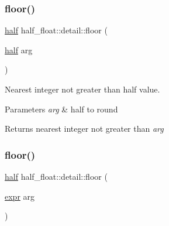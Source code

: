\subsubsection{\texorpdfstring{floor()}{floor()}\hspace{0.1cm}{\footnotesize\ttfamily [1/2]}}
{\footnotesize\ttfamily \hyperlink{classhalf__float_1_1half}{half} half\+\_\+float\+::detail\+::floor (\begin{DoxyParamCaption}\item[{\hyperlink{classhalf__float_1_1half}{half}}]{arg }\end{DoxyParamCaption})\hspace{0.3cm}{\ttfamily [inline]}}

Nearest integer not greater than half value. 
\begin{DoxyParams}{Parameters}
{\em arg} & half to round \\
\hline
\end{DoxyParams}
\begin{DoxyReturn}{Returns}
nearest integer not greater than {\itshape arg} 
\end{DoxyReturn}
\mbox{\label{namespacehalf__float_1_1detail_a07d6873ffe14938135fa22fb235cc49f}} 
\subsubsection{\texorpdfstring{floor()}{floor()}\hspace{0.1cm}{\footnotesize\ttfamily [2/2]}}
{\footnotesize\ttfamily \hyperlink{classhalf__float_1_1half}{half} half\+\_\+float\+::detail\+::floor (\begin{DoxyParamCaption}\item[{\hyperlink{structhalf__float_1_1detail_1_1expr}{expr}}]{arg }\end{DoxyParamCaption})\hspace{0.3cm}{\ttfamily [inline]}}

\mbox{\label{namespacehalf__float_1_1detail_a280ee0782f6d036ec43848c549a36e21}} 
